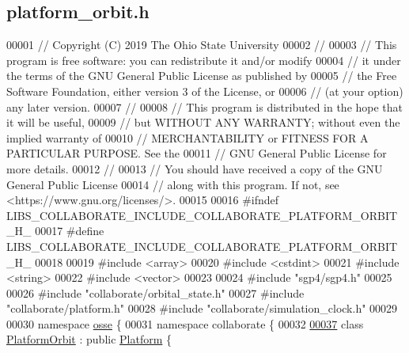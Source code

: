 \hypertarget{platform__orbit_8h_source}{}\subsection{platform\+\_\+orbit.\+h}
\label{platform__orbit_8h_source}

\begin{DoxyCode}
00001 \textcolor{comment}{// Copyright (C) 2019 The Ohio State University}
00002 \textcolor{comment}{//}
00003 \textcolor{comment}{// This program is free software: you can redistribute it and/or modify}
00004 \textcolor{comment}{// it under the terms of the GNU General Public License as published by}
00005 \textcolor{comment}{// the Free Software Foundation, either version 3 of the License, or}
00006 \textcolor{comment}{// (at your option) any later version.}
00007 \textcolor{comment}{//}
00008 \textcolor{comment}{// This program is distributed in the hope that it will be useful,}
00009 \textcolor{comment}{// but WITHOUT ANY WARRANTY; without even the implied warranty of}
00010 \textcolor{comment}{// MERCHANTABILITY or FITNESS FOR A PARTICULAR PURPOSE.  See the}
00011 \textcolor{comment}{// GNU General Public License for more details.}
00012 \textcolor{comment}{//}
00013 \textcolor{comment}{// You should have received a copy of the GNU General Public License}
00014 \textcolor{comment}{// along with this program.  If not, see <https://www.gnu.org/licenses/>.}
00015 
00016 \textcolor{preprocessor}{#ifndef LIBS\_COLLABORATE\_INCLUDE\_COLLABORATE\_PLATFORM\_ORBIT\_H\_}
00017 \textcolor{preprocessor}{#define LIBS\_COLLABORATE\_INCLUDE\_COLLABORATE\_PLATFORM\_ORBIT\_H\_}
00018 
00019 \textcolor{preprocessor}{#include <array>}
00020 \textcolor{preprocessor}{#include <cstdint>}
00021 \textcolor{preprocessor}{#include <string>}
00022 \textcolor{preprocessor}{#include <vector>}
00023 
00024 \textcolor{preprocessor}{#include "sgp4/sgp4.h"}
00025 
00026 \textcolor{preprocessor}{#include "collaborate/orbital\_state.h"}
00027 \textcolor{preprocessor}{#include "collaborate/platform.h"}
00028 \textcolor{preprocessor}{#include "collaborate/simulation\_clock.h"}
00029 
00030 \textcolor{keyword}{namespace }\hyperlink{namespaceosse}{osse} \{
00031 \textcolor{keyword}{namespace }collaborate \{
00032 
\hyperlink{classosse_1_1collaborate_1_1_platform_orbit}{00037} \textcolor{keyword}{class }\hyperlink{classosse_1_1collaborate_1_1_platform_orbit}{PlatformOrbit} : \textcolor{keyword}{public} \hyperlink{classosse_1_1collaborate_1_1_platform}{Platform} \{

\end{DoxyCode}
